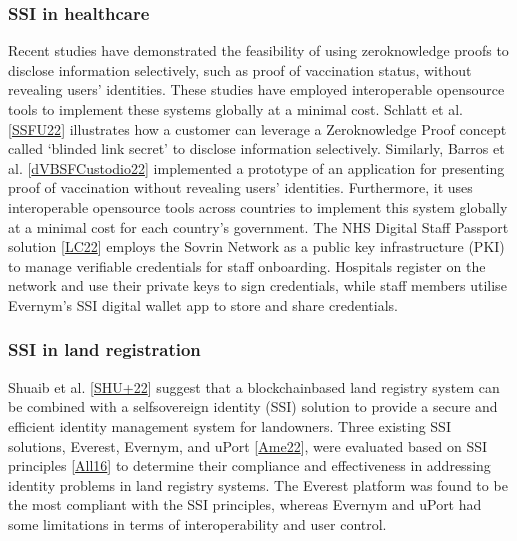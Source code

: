 \documentclass[letterpaper,10pt,english]{jupyterBook}
\begin{document}
\subsubsection{SSI in healthcare}
\label{\detokenize{SSI/ssi:ssi-in-healthcare}}
\sphinxAtStartPar
Recent studies have demonstrated the feasibility of using zero\sphinxhyphen{}knowledge proofs to disclose information selectively, such as proof of vaccination status, without revealing users’ identities. These studies have employed interoperable open\sphinxhyphen{}source tools to implement these systems globally at a minimal cost. Schlatt et al. {[}\hyperlink{cite.SSI/ssi:id45}{SSFU22}{]} illustrates how a customer can leverage a Zero\sphinxhyphen{}knowledge Proof concept called ‘blinded link secret’ to disclose information selectively. Similarly, Barros et al. {[}\hyperlink{cite.SSI/ssi:id44}{dVBSFCustodio22}{]} implemented a prototype of an application for presenting proof of vaccination without revealing users’ identities. Furthermore, it uses interoperable open\sphinxhyphen{}source tools across countries to implement this system globally at a minimal cost for each country’s government. The NHS Digital Staff Passport solution {[}\hyperlink{cite.SSI/ssi:id48}{LC22}{]} employs the Sovrin Network as a public key infrastructure (PKI) to manage verifiable credentials for staff onboarding. Hospitals register on the network and use their private keys to sign credentials, while staff members utilise Evernym’s  SSI digital wallet app to store and share credentials.


\subsubsection{SSI in land registration}
\label{\detokenize{SSI/ssi:ssi-in-land-registration}}
\sphinxAtStartPar
Shuaib et al. {[}\hyperlink{cite.SSI/ssi:id57}{SHU+22}{]} suggest that a blockchain\sphinxhyphen{}based land registry system can be combined with a self\sphinxhyphen{}sovereign identity (SSI) solution to provide a secure and efficient identity management system for landowners. Three existing SSI solutions, Everest, Evernym, and uPort {[}\hyperlink{cite.SSI/ssi:id46}{Ame22}{]}, were evaluated based on SSI principles {[}\hyperlink{cite.SSI/ssi:id61}{All16}{]} to determine their compliance and effectiveness in addressing identity problems in land registry systems. The Everest platform was found to be the most compliant with the SSI principles, whereas Evernym and uPort had some limitations in terms of interoperability and user control.
\end{document}

